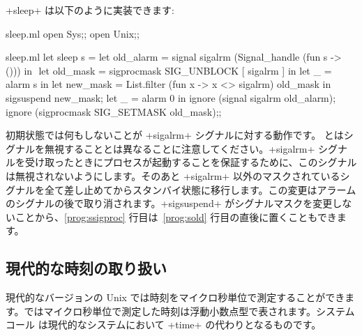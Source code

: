 \begin{example} %
\ml+sleep+ は以下のように実装できます:
%
\begin{codefile}{sleep.ml}
open Sys;;
open Unix;;
\end{codefile}
%
\begin{listingcodefile}[style=numbers]{sleep.ml}
let sleep s =
  let old_alarm = signal sigalrm (Signal_handle (fun s -> ())) in $\label{prog:sold}$
  let old_mask = sigprocmask SIG_UNBLOCK [ sigalrm ] in
  let _ = alarm s in
  let new_mask = List.filter (fun x -> x <> sigalrm) old_mask in
  sigsuspend new_mask;
  let _ = alarm 0 in
  ignore (signal sigalrm old_alarm);
  ignore (sigprocmask SIG_SETMASK old_mask)$\label{prog:ssigproc}$;;
\end{listingcodefile}
%
初期状態では何もしないことが \ml+sigalrm+ シグナルに対する動作です。 とはシグナルを無視することとは異なることに注意してください。\ml+sigalrm+ シグナルを受け取ったときにプロセスが起動することを保証するために、このシグナルは無視されないようにします。そのあと \ml+sigalrm+ 以外のマスクされているシグナルを全て差し止めてからスタンバイ状態に移行します。この変更はアラームのシグナルの後で取り消されます。\ml+sigsuspend+ がシグナルマスクを変更しないことから、\ref{prog:ssigproc} 行目は~\ref{prog:sold} 行目の直後に置くこともできます。
\end{example}

\subsection*{現代的な時刻の取り扱い}

現代的なバージョンの Unix では時刻をマイクロ秒単位で測定することができます。\ocaml ではマイクロ秒単位で測定した時刻は浮動小数点型で表されます。システムコール  は現代的なシステムにおいて \ml+time+ の代わりとなるものです。

